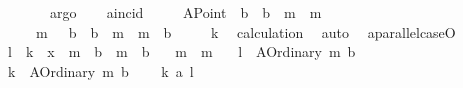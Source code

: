 \begin{isabellebody}
\ \ \ \isamarkupfalse%
\ \isamarkupfalse%
\ {\isachardoublequoteopen}{\isachardot}{\kern0pt}{\isachardot}{\kern0pt}{\isachardot}{\kern0pt}{\isachardoublequoteclose}\ \isamarkupfalse%
\ argo\isanewline
\ \ \isamarkupfalse%
\ {\isachardoublequoteopen}a{}incid\isanewline
\ \ \ \ \ {\isacharparenleft}{\kern0pt}A{}Point\ {\isacharparenleft}{\kern0pt}{\isacharminus}{\kern0pt}\ {\isacharparenleft}{\kern0pt}b{}\ {\isacharminus}{\kern0pt}\ b{}{\isacharparenright}{\kern0pt}\ {\isacharslash}{\kern0pt}\ {\isacharparenleft}{\kern0pt}m{}\ {\isacharminus}{\kern0pt}\ m{}{\isacharparenright}{\kern0pt}{\isacharparenright}{\kern0pt}\isanewline
\ \ \ \ \ \ \ {\isacharparenleft}{\kern0pt}m{}\ {\isacharasterisk}{\kern0pt}\ {\isacharparenleft}{\kern0pt}{\isacharminus}{\kern0pt}\ {\isacharparenleft}{\kern0pt}b{}\ {\isacharminus}{\kern0pt}\ b{}{\isacharparenright}{\kern0pt}\ {\isacharslash}{\kern0pt}\ {\isacharparenleft}{\kern0pt}m{}\ {\isacharminus}{\kern0pt}\ m{}{\isacharparenright}{\kern0pt}{\isacharparenright}{\kern0pt}\ {\isacharplus}{\kern0pt}\ b{}{\isacharparenright}{\kern0pt}{\isacharparenright}{\kern0pt}\isanewline
\ \ \ \ \ k{\isachardoublequoteclose}\ \isamarkupfalse%
\ calculation\ \isamarkupfalse%
\ auto\ \isanewline
{}\isamarkupfalse%
%
\endisatagproof
{\isafoldproof}%
%
\isadelimproof
\isanewline
%
\endisadelimproof
\isanewline
{}\isamarkupfalse%
\ a{}parallel{\isacharunderscore}{\kern0pt}caseO{\isacharcolon}{\kern0pt}\isanewline
\ \ \ l\ \ k\ \ x{}\ \ m{}\ \ b{}\ \ m{}\ \ b{}\isanewline
\ \ \ {\isachardoublequoteopen}m{}\ {\isasymnoteq}\ m{}{\isachardoublequoteclose}\isanewline
\ \ \ {\isachardoublequoteopen}l\ {\isacharequal}{\kern0pt}\ A{}Ordinary\ m{}\ b{}{\isachardoublequoteclose}\isanewline
\ \ \ {\isachardoublequoteopen}k\ {\isacharequal}{\kern0pt}\ A{}Ordinary\ m{}\ b{}{\isachardoublequoteclose}\isanewline
\ \ \ {\isachardoublequoteopen}{\isasymnot}\ k\ a{}{\isacharbar}{\kern0pt}{\isacharbar}{\kern0pt}\ l{\isachardoublequoteclose}\isanewline

\end{isabellebody}
